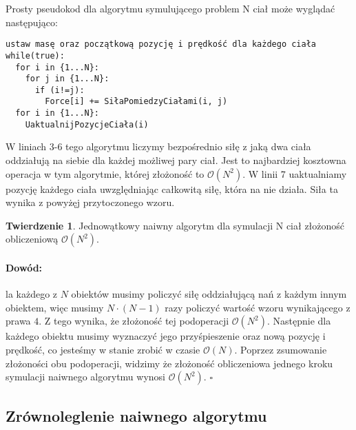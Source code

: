 \documentclass[14pt,twoside,a4paper]{article}
\newenvironment{myproof}[2] {\paragraph{Dowód:}}{\hfill$\square$}
\newcommand\tab[1][1cm]{\hspace*{#1}}
\theoremstyle{definition}
\begin{document}
Prosty pseudokod dla algorytmu symulującego problem N ciał może wyglądać następująco:\\
\bigskip
{}
\begin{lstlisting}[frame=single, framerule=2pt, caption=Pseudokod naiwnego algorytmu]
ustaw masę oraz początkową pozycję i prędkość dla każdego ciała
while(true):
  for i in {1...N}:
    for j in {1...N}:
      if (i!=j):
        Force[i] += SiłaPomiedzyCiałami(i, j) 
  for i in {1...N}:
    UaktualnijPozycjeCiała(i)
\end{lstlisting}

\bigskip

W liniach 3-6 tego algorytmu liczymy bezpośrednio siłę z jaką dwa ciała oddziałują na siebie dla każdej możliwej pary ciał. Jest to najbardziej kosztowna operacja w tym algorytmie, której złożoność to $\mathcal{O}(N^{2})$. W linii 7 uaktualniamy pozycję każdego ciała uwzględniając całkowitą siłę, która na nie działa. Siła ta wynika z powyżęj przytoczonego wzoru. 
\bigskip
\newtheorem{twr}{Twierdzenie}
\begin{twr}
Jednowątkowy naiwny algorytm dla symulacji N ciał złożoność obliczeniową $\mathcal{O}(N^{2})$.
\end{twr}

\begin{myproof}

\tab Dla każdego z $N$ obiektów musimy policzyć siłę oddziałującą nań z każdym innym obiektem, więc musimy $N\cdot (N-1)$ razy policzyć wartość wzoru wynikającego z prawa $4$. Z tego wynika, że złożoność tej podoperacji $\mathcal{O}(N^{2})$. 
Następnie dla każdego obiektu musimy wyznaczyć jego przyśpieszenie oraz nową pozycję i prędkość, co jesteśmy w stanie zrobić w czasie $\mathcal{O}(N)$.
Poprzez zsumowanie złożoności obu podoperacji, widzimy że złożoność obliczeniowa jednego kroku symulacji naiwnego algorytmu wynosi $\mathcal{O}(N^{2})$.
\end{myproof}

\bigskip

\subsection{\Large Zrównoleglenie naiwnego algorytmu}
\end{document}
